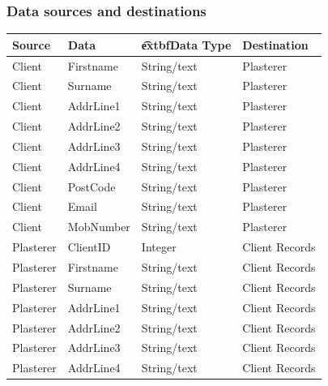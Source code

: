 \subsubsection{Data sources and destinations}



\begin{flushleft}
\begin{longtable}{|p{3cm}|p{4cm}|p{3cm}|p{3cm}|}
\hline
\textbf{Source} & \textbf{Data} & \t                                                                                                                                                                                                                                                                                                                                                                                                                                                                                       extbf{Data Type} & \textbf{Destination}  \\ \hline
Client & Firstname & String/text & Plasterer \\ \hline 
Client & Surname   & String/text & Plasterer \\ \hline
Client & AddrLine1 & String/text & Plasterer \\ \hline
Client & AddrLine2 & String/text & Plasterer \\ \hline
Client & AddrLine3 & String/text & Plasterer \\ \hline
Client & AddrLine4 & String/text & Plasterer \\ \hline
Client & PostCode  & String/text & Plasterer \\ \hline
Client & Email     & String/text & Plasterer \\ \hline
Client & MobNumber & String/text & Plasterer \\ \hline   
Plasterer & ClientID & Integer & Client Records \\ \hline
Plasterer & Firstname & String/text & Client Records \\ \hline 
Plasterer & Surname   & String/text & Client Records \\ \hline
Plasterer & AddrLine1 & String/text & Client Records \\ \hline
Plasterer & AddrLine2 & String/text & Client Records \\ \hline
Plasterer & AddrLine3 & String/text & Client Records \\ \hline
Plasterer & AddrLine4 & String/text & Client Records \\ \hline

\end{longtable}
\end{flushleft}
